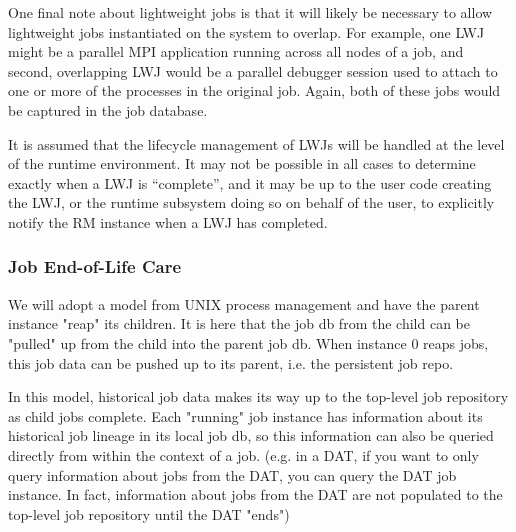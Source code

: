 One final note about lightweight jobs is that it will likely be
necessary to allow lightweight jobs instantiated on the system
to overlap. For example, one LWJ might be a parallel MPI application
running across all nodes of a job, and second, overlapping
LWJ would be a parallel debugger session used to attach to one
or more of the processes in the original job. Again, both of
these jobs would be captured in the job database.
\ifcomments
{}

It is assumed that the lifecycle management of LWJs will be
handled at the level of the runtime environment. It may not
be possible in all cases to determine exactly when a LWJ
is ``complete'', and it may be up to the user code creating
the LWJ, or the runtime subsystem doing so on behalf of
the user, to explicitly notify the RM instance when
a LWJ has completed.

\subsubsection{Job End-of-Life Care}

We will adopt a model from UNIX process management and have the
parent instance "reap" its children. It is here that the job db from
the child can be "pulled" up from the child into the parent job db.
When instance 0 reaps jobs, this job data can be pushed up to its
parent, i.e. the persistent job repo.

\ifcomments
{}
\fi

In this model, historical job data makes its way up to the top-level
job repository as child jobs complete. Each "running" job instance has
information about its historical job lineage in its local job db, so
this information can also be queried directly from within the context
of a job. (e.g. in a DAT, if you want to only query information about
jobs from the DAT, you can query the DAT job instance. In fact,
information about jobs from the DAT are not populated to the top-level
job repository until the DAT "ends")

